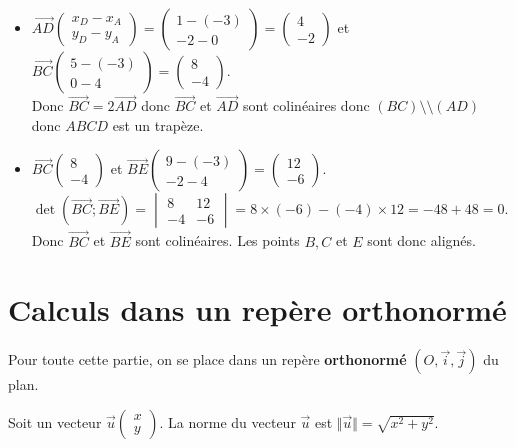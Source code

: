 \begin{Exemple}
\begin{center}
\end{center}
\begin{itemize}[label=\textcolor{Couleur8}{$\bullet$}]
\item $\overrightarrow{AD}\begin{pmatrix} 
x_D-x_A \\
y_D-y_A
 \end{pmatrix}=\begin{pmatrix} 
1-(-3) \\
-2-0
 \end{pmatrix}=\begin{pmatrix} 
4 \\
-2
 \end{pmatrix}$ et  $\overrightarrow{BC}\begin{pmatrix} 
5-(-3) \\
0-4
 \end{pmatrix}=\begin{pmatrix} 
8 \\
-4
 \end{pmatrix}$. \\Donc $\overrightarrow{BC}=2\overrightarrow{AD}$ donc $\overrightarrow{BC}$ et $\overrightarrow{AD}$ sont colinéaires donc $(BC) \setminus\setminus (AD)$ donc $ABCD$ est un trapèze.
 \item $\overrightarrow{BC}\begin{pmatrix} 
8 \\
-4
 \end{pmatrix}$ et $\overrightarrow{BE}\begin{pmatrix} 
9-(-3) \\
-2-4
 \end{pmatrix}=\begin{pmatrix} 
12 \\
-6
 \end{pmatrix}$. \\
 $\det(\overrightarrow{BC};\overrightarrow{BE})=\begin{vmatrix}
8 & 12 \\
 -4 & -6
 \end{vmatrix}=8\times (-6)-(-4)\times 12=-48+48=0$.\\ Donc $\overrightarrow{BC}$ et $\overrightarrow{BE}$ sont colinéaires. Les points $B,C$ et $E$ sont donc alignés. 
 \end{itemize}
\end{Exemple}

\newpage

\section{Calculs dans un repère orthonormé}
Pour toute cette partie, on se place dans un repère {\bf{orthonormé}} $(O,\overrightarrow{i},\overrightarrow{j})$ du plan. 
\begin{Propriété}
Soit un vecteur $\overrightarrow{u}\begin{pmatrix} 
x \\
y
 \end{pmatrix}$. La norme du vecteur $\overrightarrow{u}$ est $\Vert \overrightarrow{u} \Vert=\sqrt{x^2+y^2}$.

\end{Propriété}

